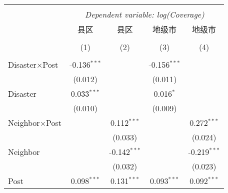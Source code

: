 
\begin{tabular}{@{\extracolsep{5pt}}lcccc}
    \\[-1.8ex]\hline
    \hline                                                                                                                                                 \\[-1.8ex]
                        & \multicolumn{4}{c}{\textit{Dependent variable: log(Coverage)}} \
    \cr \cline{2-5}
    \\[-1.8ex] & \multicolumn{1}{c}{县区} & \multicolumn{1}{c}{县区} & \multicolumn{1}{c}{地级市} & \multicolumn{1}{c}{地级市}  \\
    \\[-1.8ex] & (1) & (2) & (3) & (4) \\
    \hline                                                                                                                                                 \\[-1.8ex]
    Disaster$\times$Post       & -0.136$^{***}$                                                       &                   & -0.156$^{***}$    &                   \\
                        & (0.012)                                                              &                   & (0.011)           &                   \\
    Disaster            & 0.033$^{***}$                                                        &                   & 0.016$^{*}$       &                   \\
                        & (0.010)                                                              &                   & (0.009)           &                   \\
    Neighbor$\times$Post       &                                                                      & 0.112$^{***}$     &                   & 0.272$^{***}$     \\
                        &                                                                      & (0.033)           &                   & (0.024)           \\
    Neighbor            &                                                                      & -0.142$^{***}$    &                   & -0.219$^{***}$    \\
                        &                                                                      & (0.032)           &                   & (0.023)           \\
    Post                & 0.098$^{***}$                                                        & 0.131$^{***}$     & 0.093$^{***}$     & 0.092$^{***}$     \\

\end{tabular}

